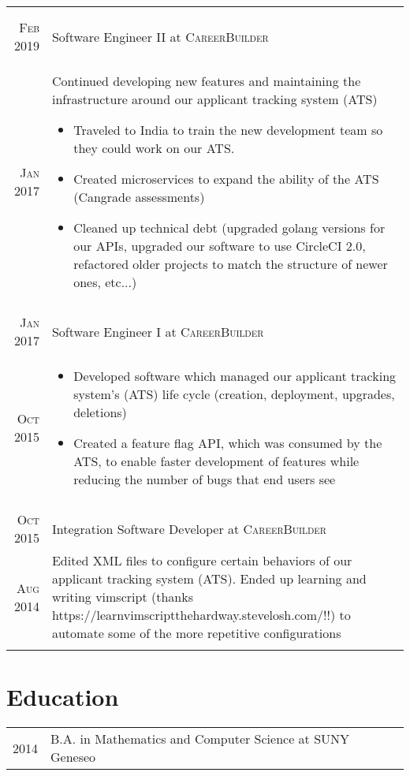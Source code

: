 \documentclass[a4paper,10pt]{article}
\begin{document}
\begin{tabular}{r|p{13cm}}
\begin{itemize}
\begin{itemize}
   \end{itemize}
 \end{itemize}
 \\
 \multicolumn{2}{c}{} \\
 \textsc{Feb 2019} & Software Engineer II at \textsc{CareerBuilder} \\
 \textsc{Jan 2017} &
 \footnotesize{Continued developing new features and maintaining the infrastructure around our applicant tracking system (ATS)}
 \begin{itemize}
   \item \footnotesize{Traveled to India to train the new development team so they could work on our ATS.}
   \item \footnotesize{Created microservices to expand the ability of the ATS (Cangrade assessments)}
   \item \footnotesize{Cleaned up technical debt (upgraded golang versions for our APIs, upgraded our software to use CircleCI 2.0, refactored older projects to match the structure of newer ones, etc...)}
 \end{itemize}
 \\
 \multicolumn{2}{c}{} \\
 \textsc{Jan 2017} & Software Engineer I at \textsc{CareerBuilder} \\
 \textsc{Oct 2015} &
 \begin{itemize}
   \item \footnotesize{Developed software which managed our applicant tracking system's (ATS) life cycle (creation, deployment, upgrades, deletions)}
   \item \footnotesize{Created a feature flag API, which was consumed by the ATS, to enable faster development of features while reducing the number of bugs that end users see}
 \end{itemize}
 \\
 \multicolumn{2}{c}{} \\
 \textsc{Oct 2015} & Integration Software Developer at \textsc{CareerBuilder} \\
 \textsc{Aug 2014} &
 \footnotesize{Edited XML files to configure certain behaviors of our applicant tracking system (ATS). Ended up learning and writing vimscript (thanks https://learnvimscriptthehardway.stevelosh.com/!!) to automate some of the more repetitive configurations}
 \\
 \multicolumn{2}{c}{} \\
\end{tabular}

\section{Education}
\begin{tabular}{rl}	
  \textsc{2014} & B.A. in Mathematics and Computer Science at SUNY Geneseo \\
\end{tabular}
\end{document}
